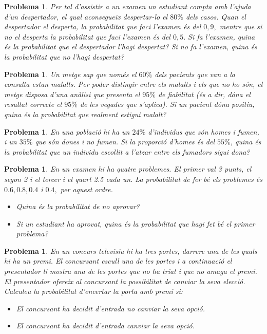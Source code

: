 \documentclass[11pt]{article}
\newcounter{prbcont}
\newtheorem{problema}[prbcont]{Problema}
\begin{document}
\begin{problema}
Per tal d'assistir a un examen un estudiant compta amb l'ajuda d'un despertador, el
qual aconsegueix despertar-lo el $80\%$ dels casos. Quan el despertador el desperta, la
probabilitat que faci l'examen \'es del $0,9,$ mentre que si no el desperta la probabilitat que
faci l'examen \'es del $0,5.$ Si fa l'examen, quina \'es la probabilitat que el despertador l'hagi
despertat? Si no fa l'examen, quina \'es la probabilitat que no l'hagi despertat?
\end{problema}

\begin{problema}
Un metge sap que nom\'es el $60\%$ dels pacients que van a la consulta estan malalts. Per
poder distingir entre els malalts i els que no ho s\'on, el metge disposa d'una an\`alisi que
presenta el $95\%$ de fiabilitat (\'es a dir, d\'ona el resultat correcte el $95\%$ de les vegades que
s'aplica). Si un pacient d\'ona positiu, quina \'es la probabilitat que realment estigui malalt?
\end{problema}

\begin{problema}
En una poblaci\'o hi ha un $24\%$ d'individus que s\'on homes i fumen, i un $35\%$ que s\'on dones
i no fumen. Si la proporci\'o d'homes \'es del $55\%$, quina \'es la probabilitat que un individu
escollit a l'atzar entre els fumadors sigui dona?
\end{problema}

\begin{problema}
En un examen hi ha quatre problemes. El primer val 3 punts, el segon 2 i el tercer i el
quart 2.5 cada un. La probabilitat de fer b\'e els problemes \'es $0.6, 0.8, 0.4$ i $0.4,$ per aquest
ordre.
\begin{itemize}
\item [(a)] Quina \'es la probabilitat de no aprovar?
\item [(b)] Si un estudiant ha aprovat, quina \'es la probabilitat que hagi fet b\'e el primer problema?
\end{itemize}
\end{problema}

\begin{problema}
En un concurs televisiu hi ha tres portes, darrere una de les quals hi ha un premi. El
concursant escull una de les portes i a continuaci\'o el presentador li mostra una de les
portes que no ha triat i que no amaga el premi. El presentador ofereix al concursant la
possibilitat de canviar la seva elecci\'o. Calculeu la probabilitat d'encertar la porta amb
premi si:
\begin{itemize}
\item [(a)] El concursant ha decidit d'entrada no canviar la seva opci\'o.
\item [(b)] El concursant ha decidit d'entrada canviar la seva opci\'o. 
\end{itemize}
\end{problema}
\end{document}
